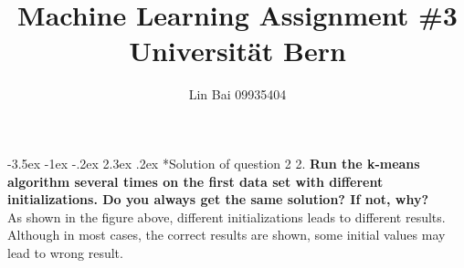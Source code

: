 \documentclass[12pt]{article}
\makeatletter
\renewcommand\section{\@startsection {section}{1}{\z@}%
	{-3.5ex \@plus -1ex \@minus -.2ex}%
	{2.3ex \@plus.2ex}%
	{\normalfont\large\bfseries}}%
\makeatother
\begin{document}
	
	
	
	\title{\textbf{Machine Learning Assignment \#3}\\
	Universit{\"a}t Bern}%
	\author{Lin Bai 09935404} %
	
	\maketitle
	

	\section*{Solution of question 2}
	2. \textbf{Run the k-means algorithm several times on the first data set with different initializations. Do you always get the same solution? If not, why?}\\
	\noindent
	As shown in the figure above, different initializations leads to different results. Although in most cases, the correct results are shown, some initial values may lead to wrong result.\\
	
\end{document}

